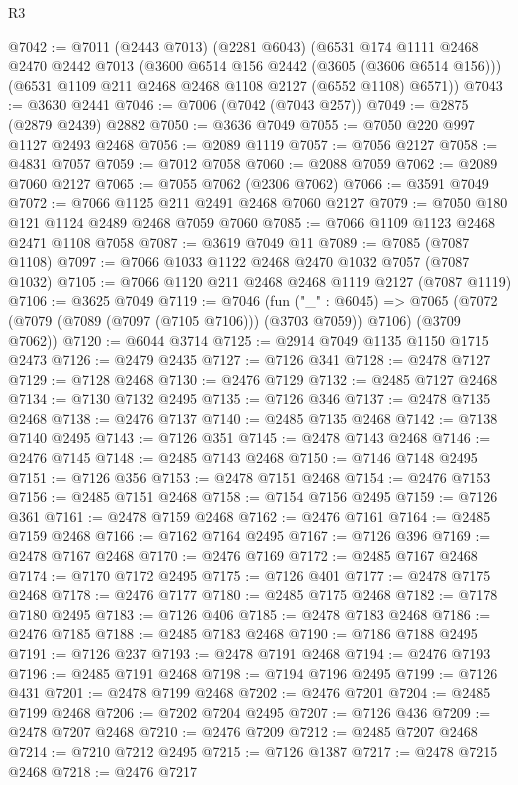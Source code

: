 \begin{lexlean}{R3}
\begin{coremodule}
@7042 := @7011
    (@2443 @7013)
    (@2281 @6043)
    (@6531
      @174
      @1111
      @2468
      @2470
      @2442
      @7013
      (@3600 @6514 @156 @2442 (@3605 (@3606 @6514 @156)))
      (@6531 @1109 @211 @2468 @2468 @1108 @2127 (@6552 @1108) @6571))
@7043 := @3630 @2441
@7046 := @7006 (@7042 (@7043 @257))
@7049 := @2875 (@2879 @2439) @2882
@7050 := @3636 @7049
@7055 := @7050 @220 @997 @1127 @2493 @2468
@7056 := @2089 @1119
@7057 := @7056 @2127
@7058 := @4831 @7057
@7059 := @7012 @7058
@7060 := @2088 @7059
@7062 := @2089 @7060 @2127
@7065 := @7055 @7062 (@2306 @7062)
@7066 := @3591 @7049
@7072 := @7066 @1125 @211 @2491 @2468 @7060 @2127
@7079 := @7050 @180 @121 @1124 @2489 @2468 @7059 @7060
@7085 := @7066 @1109 @1123 @2468 @2471 @1108 @7058
@7087 := @3619 @7049 @11
@7089 := @7085 (@7087 @1108)
@7097 := @7066 @1033 @1122 @2468 @2470 @1032 @7057 (@7087 @1032)
@7105 := @7066 @1120 @211 @2468 @2468 @1119 @2127 (@7087 @1119)
@7106 := @3625 @7049
@7119 := @7046
    (fun ("_" : @6045) =>
    @7065 (@7072 (@7079 (@7089 (@7097 (@7105 @7106))) (@3703 @7059)) @7106) (@3709 @7062))
@7120 := @6044 @3714
@7125 := @2914 @7049 @1135 @1150 @1715 @2473
@7126 := @2479 @2435
@7127 := @7126 @341
@7128 := @2478 @7127
@7129 := @7128 @2468
@7130 := @2476 @7129
@7132 := @2485 @7127 @2468
@7134 := @7130 @7132 @2495
@7135 := @7126 @346
@7137 := @2478 @7135 @2468
@7138 := @2476 @7137
@7140 := @2485 @7135 @2468
@7142 := @7138 @7140 @2495
@7143 := @7126 @351
@7145 := @2478 @7143 @2468
@7146 := @2476 @7145
@7148 := @2485 @7143 @2468
@7150 := @7146 @7148 @2495
@7151 := @7126 @356
@7153 := @2478 @7151 @2468
@7154 := @2476 @7153
@7156 := @2485 @7151 @2468
@7158 := @7154 @7156 @2495
@7159 := @7126 @361
@7161 := @2478 @7159 @2468
@7162 := @2476 @7161
@7164 := @2485 @7159 @2468
@7166 := @7162 @7164 @2495
@7167 := @7126 @396
@7169 := @2478 @7167 @2468
@7170 := @2476 @7169
@7172 := @2485 @7167 @2468
@7174 := @7170 @7172 @2495
@7175 := @7126 @401
@7177 := @2478 @7175 @2468
@7178 := @2476 @7177
@7180 := @2485 @7175 @2468
@7182 := @7178 @7180 @2495
@7183 := @7126 @406
@7185 := @2478 @7183 @2468
@7186 := @2476 @7185
@7188 := @2485 @7183 @2468
@7190 := @7186 @7188 @2495
@7191 := @7126 @237
@7193 := @2478 @7191 @2468
@7194 := @2476 @7193
@7196 := @2485 @7191 @2468
@7198 := @7194 @7196 @2495
@7199 := @7126 @431
@7201 := @2478 @7199 @2468
@7202 := @2476 @7201
@7204 := @2485 @7199 @2468
@7206 := @7202 @7204 @2495
@7207 := @7126 @436
@7209 := @2478 @7207 @2468
@7210 := @2476 @7209
@7212 := @2485 @7207 @2468
@7214 := @7210 @7212 @2495
@7215 := @7126 @1387
@7217 := @2478 @7215 @2468
@7218 := @2476 @7217

\end{coremodule}
\end{lexlean}
